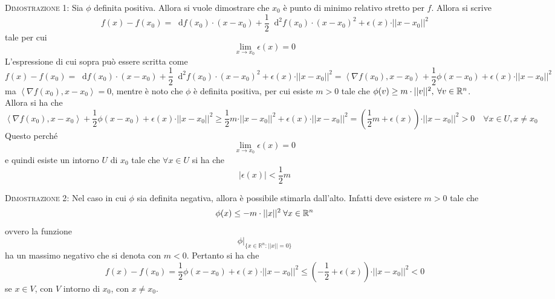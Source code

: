 \documentclass[a4paper]{extarticle}
\newcommand*\dif{\mathop{}\!\mathrm{d}}
\begin{document}
\vspace{2em}
\noindent
\normalfont \normalsize
\textsc{Dimostrazione 1}: Sia $\phi$ definita positiva. Allora si vuole dimostrare che $x_0$ è punto di minimo relativo stretto per $f$. Allora si scrive
\[f(x)-f(x_0) = \dif f(x_0) \cdot (x-x_0) + \dfrac{1}{2} \dif^2 f(x_0) \cdot (x-x_0)^2 + \epsilon(x) \cdot \vert \vert x - x_0 \vert \vert^2\]
tale per cui
\[\lim_{x \to x_0} \epsilon(x) = 0\]
L'espressione di cui sopra può essere scritta come
\[f(x)-f(x_0) = \dif f(x_0) \cdot (x-x_0) + \dfrac{1}{2} \dif^2 f(x_0) \cdot (x-x_0)^2 + \epsilon(x) \cdot \vert \vert x - x_0 \vert \vert^2 = \left< \nabla f(x_0), x-x_0 \right> + \dfrac{1}{2} \phi(x-x_0) + \epsilon(x) \cdot \vert \vert x - x_0 \vert \vert^2\]
ma $\left< \nabla f(x_0), x-x_0 \right> = 0$, mentre è noto che $\phi$ è definita positiva, per cui esiste $m>0$ tale che $\phi(v) \geq m \cdot \vert \vert v \vert \vert^2, \hspace{0.25em} \forall v \in \mathbb{R}^n$.\\
Allora si ha che
\[\left< \nabla f(x_0), x-x_0 \right> + \dfrac{1}{2} \phi(x-x_0) + \epsilon(x) \cdot \vert \vert x - x_0 \vert \vert^2 \geq \dfrac{1}{2} m \cdot \vert \vert x-x_0 \vert \vert^2 + \epsilon(x) \cdot \vert \vert x-x_0 \vert \vert^2 = \left(\dfrac{1}{2}m + \epsilon(x)\right) \cdot \vert \vert x-x_0 \vert \vert^2 > 0 \hspace{1em} \forall x \in U, x \neq x_0\]
Questo perché
\[\lim_{x \to x_0} \epsilon(x) = 0\]
e quindi esiste un intorno $U$ di $x_0$ tale che $\forall x \in U$ si ha che
\[\left \vert \epsilon(x) \right \vert < \dfrac{1}{2} m\]

\vspace{2em}
\noindent
\normalfont \normalsize
\textsc{Dimostrazione 2}: Nel caso in cui $\phi$ sia definita negativa, allora è possibile stimarla dall'alto. Infatti deve esistere $m > 0$ tale che
\[\phi(x) \leq -m \cdot \vert \vert x \vert \vert^2 \hspace*{0.25em} \forall x \in \mathbb{R}^n\]
ovvero la funzione
\[\phi \vert_{\{x \in \mathbb{R}^n : \vert \vert x \vert \vert = 0\}}\]
ha un massimo negativo che si denota con $m < 0$. Pertanto si ha che
\[f(x)-f(x_0) = \dfrac{1}{2} \phi(x-x_0) + \epsilon(x) \cdot \vert \vert x - x_0 \vert \vert^2 \leq \left(-\dfrac{1}{2} + \epsilon(x)\right) \cdot \vert \vert x-x_0 \vert \vert^2 < 0\]
se $x \in V$, con $V$ intorno di $x_0$, con $x \neq x_0$.
\end{document}
